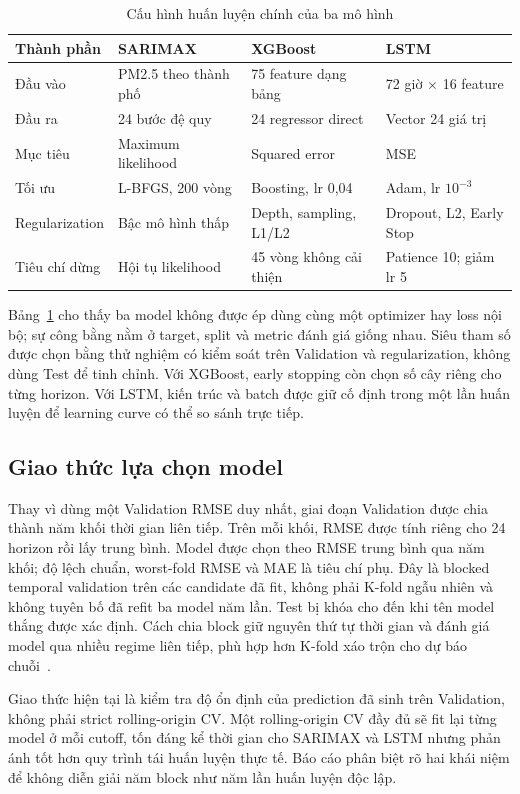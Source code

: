 \documentclass[11pt,a4paper]{article}
\begin{document}
\begin{table}[H]
\centering\small
\caption{Cấu hình huấn luyện chính của ba mô hình}
\label{tab:training}
\begin{tabular}{p{2.5cm}p{4.0cm}p{4.0cm}p{4.1cm}}
\toprule
Thành phần & SARIMAX & XGBoost & LSTM\\
\midrule
Đầu vào & PM2.5 theo thành phố & 75 feature dạng bảng & 72 giờ $\times$ 16 feature\\
Đầu ra & 24 bước đệ quy & 24 regressor direct & Vector 24 giá trị\\
Mục tiêu & Maximum likelihood & Squared error & MSE\\
Tối ưu & L-BFGS, 200 vòng & Boosting, lr 0,04 & Adam, lr $10^{-3}$\\
Regularization & Bậc mô hình thấp & Depth, sampling, L1/L2 & Dropout, L2, Early Stop\\
Tiêu chí dừng & Hội tụ likelihood & 45 vòng không cải thiện & Patience 10; giảm lr 5\\
\bottomrule
\end{tabular}
\end{table}

Bảng~\ref{tab:training} cho thấy ba model không được ép dùng cùng một optimizer hay loss nội bộ; sự công bằng nằm ở target, split và metric đánh giá giống nhau. Siêu tham số được chọn bằng thử nghiệm có kiểm soát trên Validation và regularization, không dùng Test để tinh chỉnh. Với XGBoost, early stopping còn chọn số cây riêng cho từng horizon. Với LSTM, kiến trúc và batch được giữ cố định trong một lần huấn luyện để learning curve có thể so sánh trực tiếp.

\subsection{Giao thức lựa chọn model}
Thay vì dùng một Validation RMSE duy nhất, giai đoạn Validation được chia thành năm khối thời gian liên tiếp. Trên mỗi khối, RMSE được tính riêng cho 24 horizon rồi lấy trung bình. Model được chọn theo RMSE trung bình qua năm khối; độ lệch chuẩn, worst-fold RMSE và MAE là tiêu chí phụ. Đây là blocked temporal validation trên các candidate đã fit, không phải K-fold ngẫu nhiên và không tuyên bố đã refit ba model năm lần. Test bị khóa cho đến khi tên model thắng được xác định. Cách chia block giữ nguyên thứ tự thời gian và đánh giá model qua nhiều regime liên tiếp, phù hợp hơn K-fold xáo trộn cho dự báo chuỗi~\cite{tashman}.

Giao thức hiện tại là kiểm tra độ ổn định của prediction đã sinh trên Validation, không phải strict rolling-origin CV. Một rolling-origin CV đầy đủ sẽ fit lại từng model ở mỗi cutoff, tốn đáng kể thời gian cho SARIMAX và LSTM nhưng phản ánh tốt hơn quy trình tái huấn luyện thực tế. Báo cáo phân biệt rõ hai khái niệm để không diễn giải năm block như năm lần huấn luyện độc lập.
\end{document}
